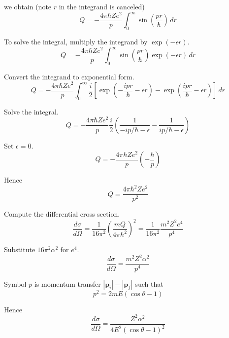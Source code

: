 we obtain (note $r$ in the integrand is canceled)
\begin{equation*}
Q=-\frac{4\pi\hbar Ze^2}{p}
\int_0^\infty\sin\left(\frac{pr}{\hbar}\right)\,dr
\end{equation*}

To solve the integral, multiply the integrand by $\exp(-\epsilon r)$.
\begin{equation*}
Q=-\frac{4\pi\hbar Ze^2}{p}
\int_0^\infty\sin\left(\frac{pr}{\hbar}\right)\exp(-\epsilon r)\,dr
\end{equation*}

Convert the integrand to exponential form.
\begin{equation*}
Q=-\frac{4\pi\hbar Ze^2}{p}
\int_0^\infty\frac{i}{2}\left[
\exp\left(-\frac{ipr}{\hbar}-\epsilon r\right)
-\exp\left(\frac{ipr}{\hbar}-\epsilon r\right)
\right]\,dr
\end{equation*}

Solve the integral.
\begin{equation*}
Q=-\frac{4\pi\hbar Ze^2}{p}\frac{i}{2}
\left(\frac{1}{-ip/\hbar-\epsilon}-\frac{1}{ip/\hbar-\epsilon}\right)
\tag{1}
\end{equation*}

Set $\epsilon=0$.
\begin{equation*}
Q=-\frac{4\pi\hbar Ze^2}{p}\left(-\frac{\hbar}{p}\right)
\end{equation*}

Hence
\begin{equation*}
Q=\frac{4\pi\hbar^2Ze^2}{p^2}
\end{equation*}

Compute the differential cross section.
\begin{equation*}
\frac{d\sigma}{d\Omega}=\frac{1}{16\pi^2}\left(\frac{mQ}{4\pi\hbar^2}\right)^2
=\frac{1}{16\pi^2}\frac{m^2Z^2e^4}{p^4}
\tag{2}
\end{equation*}

Substitute $16\pi^2\alpha^2$ for $e^4$.
\begin{equation*}
\frac{d\sigma}{d\Omega}=\frac{m^2Z^2\alpha^2}{p^4}
\end{equation*}

Symbol $p$ is momentum transfer $|\mathbf p_i|-|\mathbf p_f|$ such that
\begin{equation*}
p^2=2mE(\cos\theta-1)
\end{equation*}

Hence
\begin{equation*}
\frac{d\sigma}{d\Omega}=\frac{Z^2\alpha^2}{4E^2(\cos\theta-1)^2}
\tag{3}
\end{equation*}


